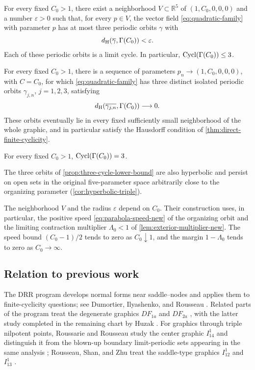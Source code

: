 \begin{theorem}
\label{thm:direct-finite-cyclicity}
For every fixed \(C_0>1\), there exist a neighborhood
\(V\subset\mathbb R^5\) of \((1,C_0,0,0,0)\) and a number
\(\varepsilon>0\) such that, for every \(p\in V\), the vector field
\eqref{eq:quadratic-family} with parameter \(p\) has at most three
periodic orbits \(\gamma\) with
\[
 d_{\mathrm H}(\overline\gamma,\Gamma(C_0))<\varepsilon .
\]
Each of these periodic orbits is a limit cycle. In particular,
\(\operatorname{Cycl}(\Gamma(C_0))\le3\).
\end{theorem}

\begin{proposition}
\label{prop:three-cycle-lower-bound}
For every fixed \(C_0>1\), there is a sequence of parameters
\(p_n\to(1,C_0,0,0,0)\), with \(C=C_0\), for which
\eqref{eq:quadratic-family} has three distinct isolated periodic
orbits \(\gamma_{j,n}\), \(j=1,2,3\), satisfying
\[
 d_{\mathrm H}(\overline{\gamma_{j,n}},\Gamma(C_0))\longrightarrow0.
\]
These orbits eventually lie in every fixed sufficiently small
neighborhood of the whole graphic, and in particular satisfy the
Hausdorff condition of \cref{thm:direct-finite-cyclicity}.
\end{proposition}

\begin{corollary}
\label{cor:exact-local-cyclicity-three}
For every fixed \(C_0>1\), \(\operatorname{Cycl}(\Gamma(C_0))=3\).
\end{corollary}

The three orbits of \cref{prop:three-cycle-lower-bound} are also
hyperbolic and persist on open sets in the original five-parameter space
arbitrarily close to the organizing parameter
(\cref{cor:hyperbolic-triple}).

The neighborhood \(V\) and the radius \(\varepsilon\) depend on
\(C_0\). Their construction uses, in particular, the positive
speed \eqref{eq:parabola-speed-new} of the organizing orbit and the
limiting contraction multiplier \(\Lambda_0<1\) of
\cref{lem:exterior-multiplier-new}.
The speed bound \((C_0-1)/2\) tends to zero as \(C_0\downarrow1\),
and the margin \(1-\Lambda_0\) tends to zero as \(C_0\to\infty\).

\subsection*{Relation to previous work}

The DRR program develops normal forms near saddle--nodes and applies them to
finite-cyclicity questions; see Dumortier, Ilyashenko, and Rousseau
\cite{DIR2002}. Related parts of the program treat the degenerate graphics
$DF_{1a}$ and $DF_{2a}$ \cite{DR2009}, with the latter study completed in the
remaining chart by Huzak \cite{Huzak2018}. For graphics through
triple nilpotent points, Roussarie and Rousseau study the center graphic
$I_{14}^1$ and distinguish it from the blown-up boundary limit-periodic sets
appearing in the same analysis \cite{RR2015}; Rousseau, Shan, and Zhu treat
the saddle-type graphics $I_{12}^1$ and $I_{13}^1$ \cite{RSZ2016}.

